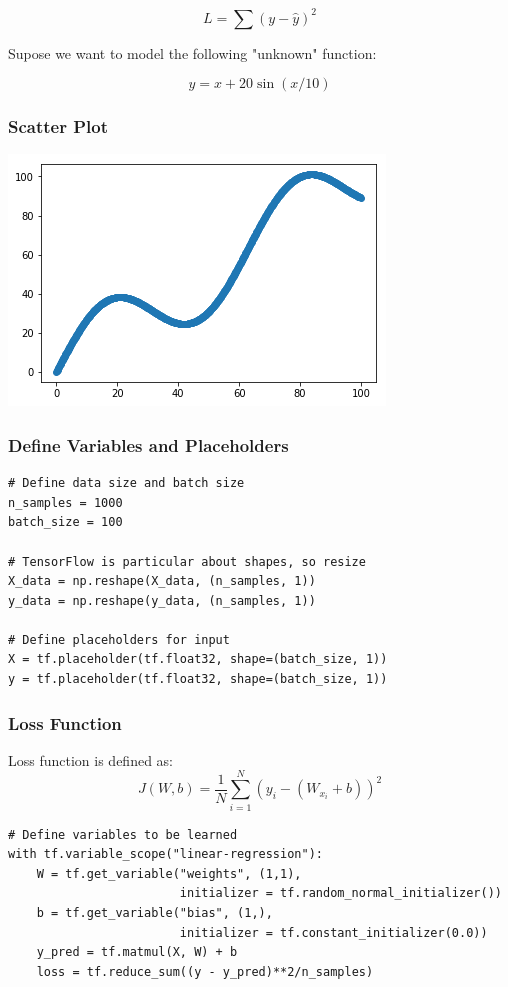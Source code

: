 \documentclass[11pt]{article}
\begin{document}
$$L = \sum (y - \hat{y})^2$$

Supose we want to model the following "unknown" function:

$$y = x + 20 \sin(x/10)$$
\subsubsection*{Scatter Plot}
\label{sec:org140efc6}
\begin{center}
\begin{center}
\includegraphics[width=.9\linewidth]{images/sample_data.png}
\end{center}
\end{center}
\subsubsection*{Define Variables and Placeholders}
\label{sec:org1375dde}
\begin{verbatim}
# Define data size and batch size
n_samples = 1000
batch_size = 100

# TensorFlow is particular about shapes, so resize
X_data = np.reshape(X_data, (n_samples, 1))
y_data = np.reshape(y_data, (n_samples, 1))

# Define placeholders for input
X = tf.placeholder(tf.float32, shape=(batch_size, 1))
y = tf.placeholder(tf.float32, shape=(batch_size, 1))
\end{verbatim}
\subsubsection*{Loss Function}
\label{sec:orge56810c}
Loss function is defined as:
$$J(W,b) = \frac{1}{N}\sum_{i=1}^{N}(y_i-(W_{x_i}+b))^2$$

\begin{verbatim}
# Define variables to be learned
with tf.variable_scope("linear-regression"):
    W = tf.get_variable("weights", (1,1),
                        initializer = tf.random_normal_initializer())
    b = tf.get_variable("bias", (1,),
                        initializer = tf.constant_initializer(0.0))
    y_pred = tf.matmul(X, W) + b
    loss = tf.reduce_sum((y - y_pred)**2/n_samples)
\end{verbatim}
\end{document}
